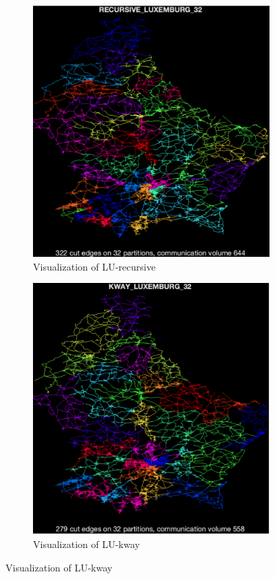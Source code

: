 \documentclass[unicode,11pt,a4paper,oneside,numbers=endperiod,openany]{scrartcl}
\begin{document}
\begin{figure}[htbp]
    \centering
    
    \begin{subfigure}[b]{0.4\textwidth}
        \includegraphics[width=\textwidth]{images/lu-recu.png}
        \caption{Visualization of LU-recursive}
    \end{subfigure}
    \hfill
    \begin{subfigure}[b]{0.4\textwidth}
        \includegraphics[width=\textwidth]{images/lu-kway.png}
        \caption{Visualization of LU-kway} 
    \end{subfigure}
    
\end{figure}
\end{document}
